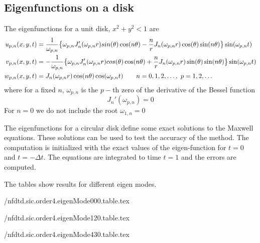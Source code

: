 \subsection{Eigenfunctions on a disk}

The eigenfunctions for a unit disk, $x^2+y^2 < 1$ are
\begin{align*}
   u_{p,n}(x,y,t) &=  {1\over \omega_{p,n}}\big\{ 
              \omega_{p,n}J_n'(\omega_{p,n} r ) sin(\theta)\cos(n \theta)
                 - {n\over r} J_n(\omega_{p,n} r ) \cos(\theta) \sin(n \theta)  \big\}   \sin(\omega_{p,n} t) \\
   v_{p,n}(x,y,t) &= -{1\over \omega_{p,n}}\big\{ 
              \omega_{p,n}J_n'(\omega_{p,n} r ) cos(\theta)\cos(n \theta) 
                 + {n\over r} J_n(\omega_{p,n} r ) \sin(\theta) \sin(n \theta)  \big\}   \sin(\omega_{p,n} t)  \\
   w_{p,n}(x,y,t) & = J_n( \omega_{p,n} r ) \cos(n \theta) \cos(\omega_{p,n} t)
                  \qquad n=0,1,2,\ldots,~p=1,2,\ldots  
\end{align*}
where for a fixed $n$, $\omega_{p,n}$ is the $p-$th zero of the derivative of the Bessel function
\[
     J_n'(\omega_{p,n})=0
\]
For $n=0$ we do not include the root $\omega_{1,n}=0$

The eigenfunctions for a circular disk define some exact solutions to the Maxwell equations.
These solutions can be used to test the accuracy of the method.
The computation is initialized with the exact values of the eigen-function for $t=0$ and $t=-\Delta t$.
The equations are integrated to time $t=1$ and the errors are computed.

The tables show results for different eigen modes.

 \maxDoc/nfdtd.sic.order4.eigenMode000.table.tex

 \maxDoc/nfdtd.sic.order4.eigenMode120.table.tex

 \maxDoc/nfdtd.sic.order4.eigenMode430.table.tex


